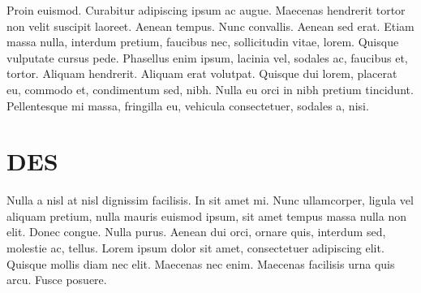 \documentclass[oneside]{mgr}
\begin{document}
Proin euismod. Curabitur adipiscing ipsum ac augue. Maecenas hendrerit
tortor non velit suscipit laoreet. Aenean tempus. Nunc
convallis. Aenean sed erat. Etiam massa nulla, interdum pretium,
faucibus nec, sollicitudin vitae, lorem. Quisque vulputate cursus
pede. Phasellus enim ipsum, lacinia vel, sodales ac, faucibus et,
tortor. Aliquam hendrerit. Aliquam erat volutpat. Quisque dui lorem,
placerat eu, commodo et, condimentum sed, nibh. Nulla eu orci in nibh
pretium tincidunt. Pellentesque mi massa, fringilla eu, vehicula
consectetuer, sodales a, nisi.


\chapter{DES}
Nulla a nisl at nisl dignissim facilisis. In sit amet mi. Nunc
ullamcorper, ligula vel aliquam pretium, nulla mauris euismod ipsum,
sit amet tempus massa nulla non elit. Donec congue. Nulla
purus. Aenean dui orci, ornare quis, interdum sed, molestie ac,
tellus. Lorem ipsum dolor sit amet, consectetuer adipiscing
elit. Quisque mollis diam nec elit. Maecenas nec enim. Maecenas
facilisis urna quis arcu. Fusce posuere.


\appendix
\end{document}
